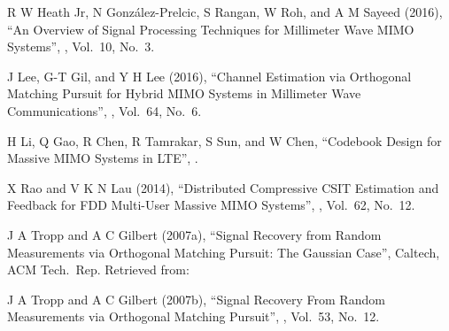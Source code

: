 \item R W Heath Jr, N González-Prelcic, S Rangan, W Roh, and A M Sayeed (2016), ``An Overview of Signal Processing Techniques for Millimeter Wave MIMO Systems'', , Vol.\ 10, No.\ 3.

\item J Lee, G-T Gil, and Y H Lee (2016), ``Channel Estimation via Orthogonal Matching Pursuit for Hybrid MIMO Systems in Millimeter Wave Communications'', , Vol.\ 64, No.\ 6.

\item H Li, Q Gao, R Chen, R Tamrakar, S Sun, and W Chen, ``Codebook Design for Massive MIMO Systems in LTE'', .

\item X Rao and V K N Lau (2014), ``Distributed Compressive CSIT Estimation and Feedback for FDD Multi-User Massive MIMO Systems'', , Vol.\ 62, No.\ 12.

\item J A Tropp and A C Gilbert (2007a), ``Signal Recovery from Random Measurements via Orthogonal Matching Pursuit: The Gaussian Case'', Caltech, ACM Tech.\ Rep. Retrieved from: 

\item J A Tropp and A C Gilbert (2007b), ``Signal Recovery From Random Measurements via Orthogonal Matching Pursuit'', , Vol.\ 53, No.\ 12.

\stopitemize

\stoptitle


